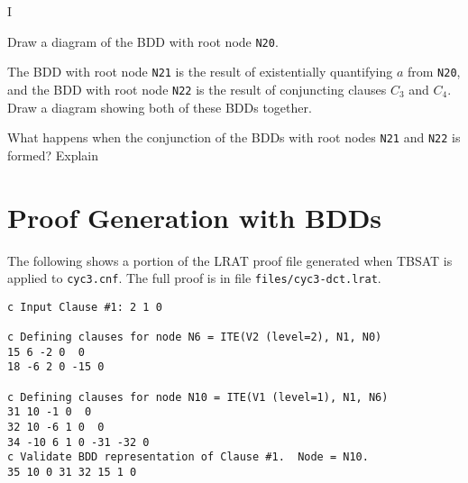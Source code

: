 \begin{problem}{I}
\begin{choice}
\item Draw a diagram of the BDD with root node \texttt{N20}.
\solution{1.5in}{\begin{center}\end{center}}

\item The BDD with root node \texttt{N21} is the result of existentially quantifying $a$ from \texttt{N20}, and
the BDD with root node \texttt{N22} is the result of conjuncting clauses $C_3$ and $C_4$.  
Draw a diagram showing both of these BDDs together.
\solution{1.5in}{\begin{center}\end{center}}

\item What happens when the conjunction of the BDDs with root nodes \texttt{N21} and \texttt{N22} is formed?  Explain

\end{choice}
\end{problem}

\newpage
\section*{Proof Generation with BDDs}

The following shows a portion of the LRAT proof file generated when TBSAT is applied to \texttt{cyc3.cnf}.
The full proof is in file \texttt{files/cyc3-dct.lrat}.
\begin{lstlisting}
c Input Clause #1: 2 1 0

c Defining clauses for node N6 = ITE(V2 (level=2), N1, N0)
15 6 -2 0  0
18 -6 2 0 -15 0

c Defining clauses for node N10 = ITE(V1 (level=1), N1, N6)
31 10 -1 0  0
32 10 -6 1 0  0
34 -10 6 1 0 -31 -32 0
c Validate BDD representation of Clause #1.  Node = N10.
35 10 0 31 32 15 1 0
\end{lstlisting}

